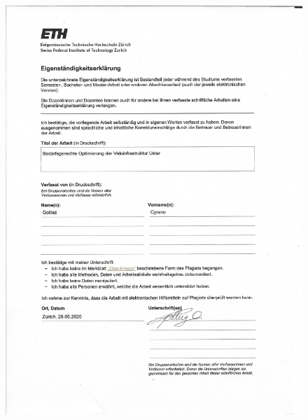



{}



\cleardoublepage

\begin{figure}[h!]
	\centering
	\includegraphics[width=\textwidth]{content/f-00-02-a-Declaration}
\end{figure}

\cleardoublepage

